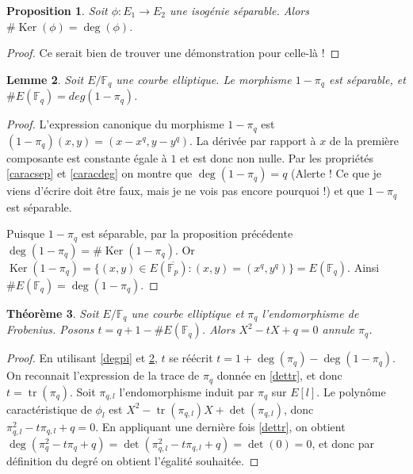 \documentclass{article}
\theoremstyle{plain}%
\newtheorem{thm}{Théorème}[section]
\newtheorem{prop}[thm]{Proposition}
\newtheorem{lem}[thm]{Lemme}
\theoremstyle{definition}%
\newcommand{\F}{\mathbb{F}}
\DeclareMathOperator{\tr}{tr}
\DeclareMathOperator{\Ker}{Ker}
\begin{document}
%

\begin{prop}
  Soit $\phi:E_1\to E_2$ une isogénie séparable. Alors $\# \Ker(\phi) = \deg(\phi)$.  
\end{prop}

\begin{proof}
  {\color{red} Ce serait bien de trouver une démonstration pour celle-là !}
\end{proof}

\begin{lem}
  \label{cardpi}
  Soit $E/\F_q$ une courbe elliptique. Le morphisme $1-\pi_q$ est séparable, et $\#E(\F_q) = deg(1 - \pi_q)$.
\end{lem}

\begin{proof}
  L'expression canonique du morphisme $1-\pi_q$ est $(1-\pi_q)(x, y) = (x-x^q, y-y^q)$. La dérivée par rapport à $x$ de la première composante est constante égale à $1$ et est donc non nulle. Par les propriétés \ref{caracsep} et \ref{caracdeg} on montre que $\deg(1-\pi_q) = q$ {\color{red} (Alerte ! Ce que je viens d'écrire doit être faux, mais je ne vois pas encore pourquoi !)} et que $1-\pi_q$ est séparable.

  Puisque $1-\pi_q$ est séparable, par la proposition précédente $\deg(1-\pi_q) = \# \Ker(1-\pi_q)$. Or $\Ker(1-\pi_q) = \{(x, y) \in E(\overline{\F_p}) : (x, y) = (x^q, y^q) \} = E(\F_q)$. Ainsi $\# E(\F_q) = \deg(1-\pi_q)$.
\end{proof}

\begin{thm}
  \label{polcarac}
  Soit $E/\F_q$ une courbe elliptique et $\pi_q$ l'endomorphisme de Frobenius. Posons $t=q+1-\#E(\F_q)$. Alors $X^2 -tX + q = 0$ annule $\pi_q$.
\end{thm}

\begin{proof}
  En utilisant \ref{degpi} et \ref{cardpi}, $t$ se réécrit $t = 1 + \deg(\pi_q) - \deg(1-\pi_q)$. On reconnait l'expression de la trace de $\pi_q$ donnée en \ref{dettr}, et donc $t = \tr(\pi_q)$. Soit $\pi_{q, l}$ l'endomorphisme induit par $\pi_q$ sur $E[l]$. Le polynôme caractéristique de $\phi_l$ est $X^2 -\tr(\pi_{q,l}) X + \det(\pi_{q, l})$, donc $\pi_{q,l}^2 - t\pi_{q,l}+q = 0$. En appliquant une dernière fois \ref{dettr}, on obtient $\deg(\pi_{q}^2 - t\pi_{q}+q ) = \det (\pi_{q,l}^2 - t\pi_{q,l}+q ) = \det(0) = 0$, et donc par définition du degré on obtient l'égalité souhaitée.
\end{proof}
\end{document}
